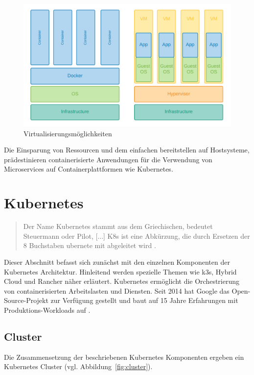 \begin{figure}
    \centering
    \includegraphics[width=1.0\columnwidth]{images/Container-VM.png}
    \caption{Virtualisierungsmöglichkeiten \protect}
    \label{fig:containervm}
\end{figure}

Die Einsparung von Ressourcen und dem einfachen bereitstellen auf Hostsysteme,
prädestinieren containerisierte Anwendungen für die Verwendung von Microservices
auf Containerplattformen wie Kubernetes.


\section{Kubernetes}
\begin{quote}
  \glqq Der Name Kubernetes stammt aus dem Griechischen, bedeutet Steuermann oder Pilot, [...]
K8s ist eine Abkürzung, die durch Ersetzen der 8 Buchstaben \glqq ubernete\grqq{} mit \grqq{} abgeleitet wird\grqq{} \cite{kubernetes}.
\end{quote}


Dieser Abschnitt befasst sich zunächst mit den einzelnen Komponenten der Kubernetes Architektur.
Hinleitend werden spezielle Themen wie k3s, Hybrid Cloud und Rancher näher erläutert.
Kubernetes ermöglicht die Orchestrierung von containerisierten Arbeitslasten
und Diensten. Seit 2014 hat Google das Open-Source-Projekt zur Verfügung
gestellt und baut auf 15 Jahre Erfahrungen mit Produktions-Workloads auf \cite{kubernetes}.

\subsection{Cluster}
Die Zusammensetzung der beschriebenen Kubernetes Komponenten ergeben ein Kubernetes Cluster (vgl. Abbildung~\ref{fig:cluster}).



